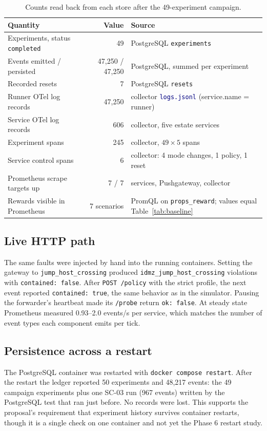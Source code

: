 \documentclass[11pt]{article}
\newcommand{\code}[1]{\texttt{\small #1}}
\newcommand{\file}[1]{\textcolor{navy}{\texttt{\small #1}}}
\begin{document}
\begin{table}[h]
\centering
\caption{Counts read back from each store after the 49-experiment campaign.}
\label{tab:integrity}
\small
\begin{tabular}{>{\RaggedRight\arraybackslash}p{5.0cm} r >{\RaggedRight\arraybackslash}p{6.4cm}}
\toprule
\textbf{Quantity} & \textbf{Value} & \textbf{Source}\\
\midrule
Experiments, status \code{completed} & 49 & PostgreSQL \code{experiments}\\
Events emitted / persisted & 47{,}250 / 47{,}250 & PostgreSQL, summed per experiment\\
Recorded resets & 7 & PostgreSQL \code{resets}\\
Runner OTel log records & 47{,}250 & collector \file{logs.jsonl} (service.name = runner)\\
Service OTel log records & 606 & collector, five estate services\\
Experiment spans & 245 & collector, $49 \times 5$ spans\\
Service control spans & 6 & collector: 4 mode changes, 1 policy, 1 reset\\
Prometheus scrape targets up & 7 / 7 & 5 services, Pushgateway, collector\\
Rewards visible in Prometheus & 7 scenarios & PromQL on \code{props\_reward}; values equal Table~\ref{tab:baseline}\\
\bottomrule
\end{tabular}
\end{table}

\subsection{Live HTTP path}
\label{sec:live}
The same faults were injected by hand into the running containers. Setting the
gateway to \code{jump\_host\_crossing} produced \code{idmz\_jump\_host\_crossing}
violations with \code{contained: false}. After \code{POST /policy} with the strict
profile, the next event reported \code{contained: true}, the same behavior as in
the simulator. Pausing the forwarder's heartbeat made its \code{/probe} return
\code{ok: false}. At steady state Prometheus measured 0.93--2.0 events/s per
service, which matches the number of event types each component emits per tick.

\subsection{Persistence across a restart}
\label{sec:persist}
The PostgreSQL container was restarted with \code{docker compose restart}. After
the restart the ledger reported 50 experiments and 48{,}217 events: the 49
campaign experiments plus one SC-03 run (967 events) written by the PostgreSQL
test that ran just before. No records were lost. This supports the proposal's
requirement that experiment history survives container restarts, though it is a
single check on one container and not yet the Phase 6 restart study.
\end{document}
